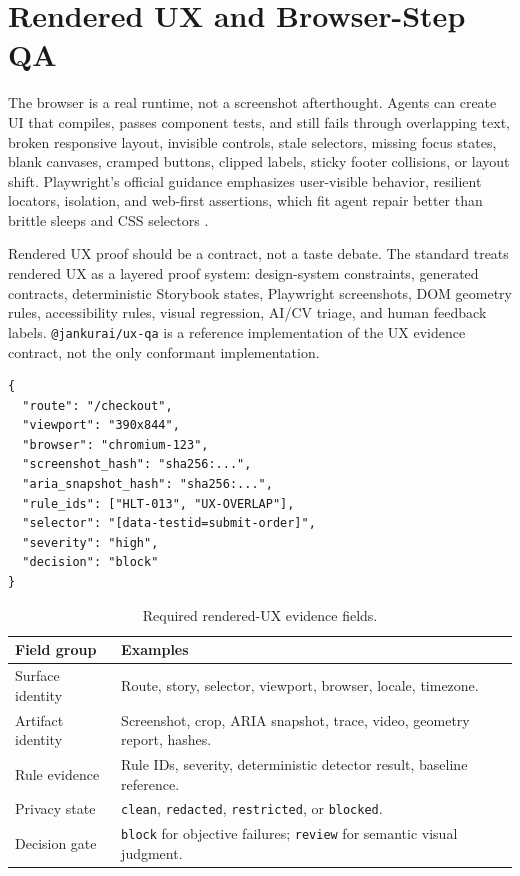 \section{Rendered UX and Browser-Step QA}

The browser is a real runtime, not a screenshot afterthought. Agents can create UI that compiles, passes component tests, and still fails through overlapping text, broken responsive layout, invisible controls, stale selectors, missing focus states, blank canvases, cramped buttons, clipped labels, sticky footer collisions, or layout shift. Playwright's official guidance emphasizes user-visible behavior, resilient locators, isolation, and web-first assertions, which fit agent repair better than brittle sleeps and CSS selectors \cite{playwrightBestPractices2026,playwrightWritingTests2026}.

Rendered UX proof should be a contract, not a taste debate. The standard treats rendered UX as a layered proof system: design-system constraints, generated contracts, deterministic Storybook states, Playwright screenshots, DOM geometry rules, accessibility rules, visual regression, AI/CV triage, and human feedback labels. \texttt{@jankurai/ux-qa} is a reference implementation of the UX evidence contract, not the only conformant implementation.

\begin{lstlisting}[style=codebox]
{
  "route": "/checkout",
  "viewport": "390x844",
  "browser": "chromium-123",
  "screenshot_hash": "sha256:...",
  "aria_snapshot_hash": "sha256:...",
  "rule_ids": ["HLT-013", "UX-OVERLAP"],
  "selector": "[data-testid=submit-order]",
  "severity": "high",
  "decision": "block"
}
\end{lstlisting}

\begin{table}[t]
\caption{Required rendered-UX evidence fields.}
\label{tab:ux-evidence-fields}
\centering
\scriptsize
\begin{tabularx}{\columnwidth}{L{0.34\columnwidth} Y}
\toprule
\textbf{Field group} & \textbf{Examples} \\
\midrule
Surface identity & Route, story, selector, viewport, browser, locale, timezone. \\
Artifact identity & Screenshot, crop, ARIA snapshot, trace, video, geometry report, hashes. \\
Rule evidence & Rule IDs, severity, deterministic detector result, baseline reference. \\
Privacy state & \texttt{clean}, \texttt{redacted}, \texttt{restricted}, or \texttt{blocked}. \\
Decision gate & \texttt{block} for objective failures; \texttt{review} for semantic visual judgment. \\
\bottomrule
\end{tabularx}
\end{table}

